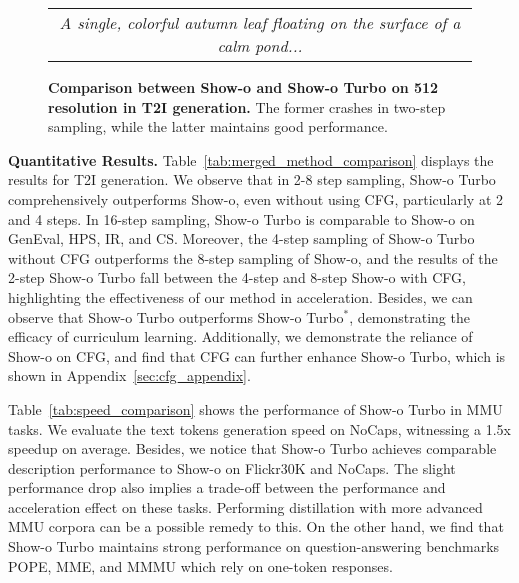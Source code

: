 \begin{figure*}[htbp]
\begin{tabular}{cccccccc}
        \multicolumn{8}{c}{\small \textit{A single, colorful autumn leaf floating on the surface of a calm pond...}} 


        
    \end{tabular}

    \caption{\textbf{Comparison between Show-o and Show-o Turbo on 512 resolution in T2I generation.} The former crashes in two-step sampling, while the latter maintains good performance.} 
    \label{fig:t2i_comparison}
\end{figure*}

\noindent \textbf{Quantitative Results.} 
Table~\ref{tab:merged_method_comparison} displays the results for T2I generation.
We observe that in 2-8 step sampling, Show-o Turbo comprehensively outperforms Show-o, even without using CFG, particularly at 2 and 4 steps. 
In 16-step sampling, Show-o Turbo is comparable to Show-o on GenEval, 
HPS, IR, and CS. 
Moreover, the 4-step sampling of Show-o Turbo without CFG 
outperforms 
the 8-step sampling of Show-o, and the results of the 2-step Show-o Turbo fall between the 4-step and 8-step Show-o with CFG, highlighting the effectiveness of our method in acceleration. 
Besides, we can observe that Show-o Turbo outperforms Show-o Turbo$^{*}$, demonstrating the efficacy of curriculum learning. 
Additionally, we demonstrate the reliance of Show-o on CFG, and find that CFG can further enhance Show-o Turbo, which is shown in Appendix~\ref{sec:cfg_appendix}.


Table~\ref{tab:speed_comparison} shows the performance of Show-o Turbo in MMU tasks.
We evaluate the text tokens generation speed on NoCaps, witnessing a 1.5x speedup on average. 
Besides, we notice that Show-o Turbo achieves comparable description performance to Show-o on Flickr30K and NoCaps.
The slight performance drop also implies a trade-off between the performance and acceleration effect on these tasks. 
Performing distillation with more advanced MMU corpora can be a possible remedy to this. 
On the other hand, we find that Show-o Turbo maintains strong performance on question-answering benchmarks POPE, MME, and MMMU which rely on one-token responses. 

